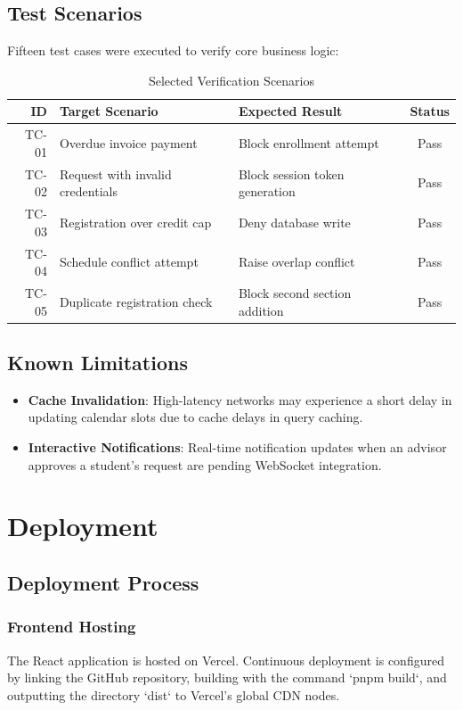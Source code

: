 \documentclass[12pt,a4paper]{report}
\begin{document}
\section{Test Scenarios}
Fifteen test cases were executed to verify core business logic:
\begin{table}[h]
\centering
\begin{tabular}{rllc}
\toprule
\textbf{ID} & \textbf{Target Scenario} & \textbf{Expected Result} & \textbf{Status} \\
\midrule
TC-01 & Overdue invoice payment & Block enrollment attempt & Pass \\
TC-02 & Request with invalid credentials & Block session token generation & Pass \\
TC-03 & Registration over credit cap & Deny database write & Pass \\
TC-04 & Schedule conflict attempt & Raise overlap conflict & Pass \\
TC-05 & Duplicate registration check & Block second section addition & Pass \\
\bottomrule
\end{tabular}
\caption{Selected Verification Scenarios}
\end{table}

\section{Known Limitations}
\begin{itemize}
    \item \textbf{Cache Invalidation}: High-latency networks may experience a short delay in updating calendar slots due to cache delays in query caching.
    \item \textbf{Interactive Notifications}: Real-time notification updates when an advisor approves a student's request are pending WebSocket integration.
\end{itemize}

\chapter{Deployment}
\section{Deployment Process}
\subsection{Frontend Hosting}
The React application is hosted on Vercel. Continuous deployment is configured by linking the GitHub repository, building with the command `pnpm build`, and outputting the directory `dist` to Vercel's global CDN nodes.
\end{document}
